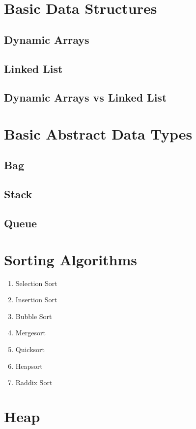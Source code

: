 \documentclass{article}
\begin{document}
\section{Basic Data Structures}

\subsection{Dynamic Arrays}
\subsection{Linked List}
\subsection{Dynamic Arrays vs Linked List}

\section{Basic Abstract Data Types}

\subsection{Bag}

\subsection{Stack}

\subsection{Queue}

\section{Sorting Algorithms}

\begin{enumerate}
    \item Selection Sort
    \item Insertion Sort
    \item Bubble Sort
    \item Mergesort
    \item Quicksort
    \item Heapsort
    \item Raddix Sort
\end{enumerate}

\section{Heap}
\end{document}
